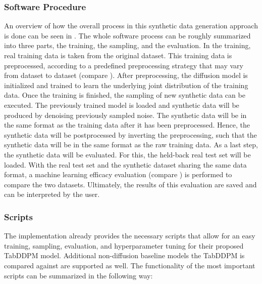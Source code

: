 \subsubsection[]{Software Procedure}
\label{ch:Software_Procedure}

An overview of how the overall process in this synthetic data generation approach is done can be seen in .
The whole software process can be roughly summarized into three parts, the training, the sampling, and the evaluation.
In the training, real training data is taken from the original dataset.
This training data is preprocessed, according to a predefined preprocessing strategy that may vary from dataset to dataset (compare ).
After preprocessing, the diffusion model is initialized and trained to learn the underlying joint distribution of the training data.
Once the training is finished, the sampling of new synthetic data can be executed.
The previously trained model is loaded and synthetic data will be produced by denoising previously sampled noise.
The synthetic data will be in the same format as the training data after it has been preprocessed.
Hence, the synthetic data will be postprocessed by inverting the preprocessing, such that the synthetic data will be in the same format as the raw training data.
As a last step, the synthetic data will be evaluated. 
For this, the held-back real test set will be loaded.
With the real test set and the synthetic dataset sharing the same data format, a machine learning efficacy evaluation (compare ) is performed to compare the two datasets.
Ultimately, the results of this evaluation are saved and can be interpreted by the user.

\subsubsection[]{Scripts}
\label{ch:scripts}

The implementation \cite{akim2023TabDDPMModellingTabular} already provides the necessary scripts that allow for an
easy training, sampling, evaluation, and hyperparameter tuning for their proposed TabDDPM model.
Additional non-diffusion baseline models the TabDDPM is compared against are supported as well.
The functionality of the most important scripts can be summarized in the following way:

